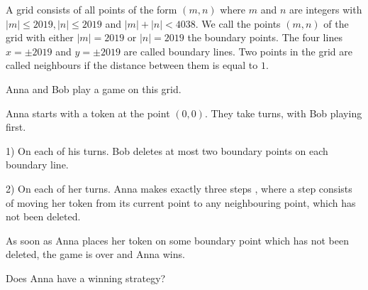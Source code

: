 A grid consists of all points of the form $(m, n)$ where $m$ and $n$ are integers with $|m|\le 2019,|n| \le 2019$ and $|m| +|n| < 4038$. We call the points $(m,n)$ of the grid with either $|m| = 2019$ or $|n| = 2019$ the boundary points. The four lines $x = \pm 2019$ and $y= \pm 2019$ are called boundary lines. Two points in the grid are called neighbours  if the distance between them is equal to $1$.

Anna and Bob play a game on this grid.

Anna starts with a token at the point $(0,0)$. They take turns, with Bob playing first.

1) On each of his turns. Bob deletes  at most two boundary points on each boundary line.

2) On each of her turns. Anna makes exactly three steps , where a step  consists of moving her token from its current point to any neighbouring point, which has not been deleted.

As soon as Anna places her token on some boundary point which has not been deleted, the game is over and Anna wins.

Does Anna have a winning strategy?